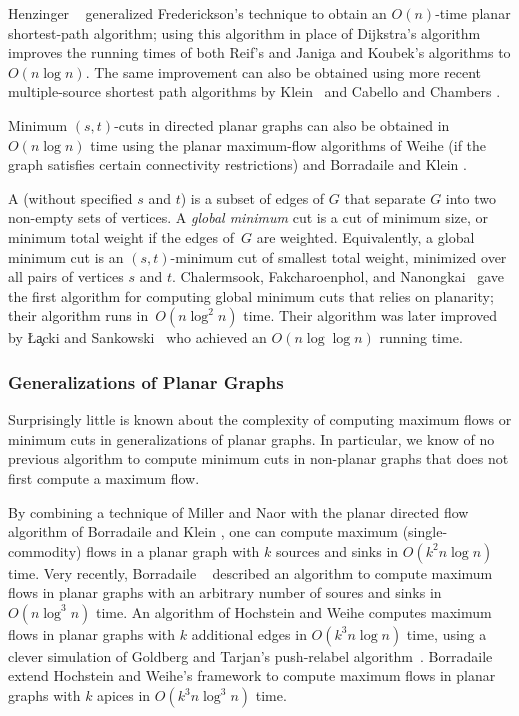 \documentclass[11pt,twoside]{article}
\begin{document}
Henzinger \etal~\cite{hkrs-fspap-97} generalized Frederickson's technique to obtain an $O(n)$-time planar shortest-path algorithm; using this algorithm in place of Dijkstra's algorithm improves the running times of both Reif's and Janiga and Koubek's algorithms to $O(n\log n)$.  The same improvement can also be obtained using more recent multiple-source shortest path algorithms by Klein~\cite{k-msspp-05} and Cabello and Chambers \cite{cc-msspg-07}.

Minimum $(s,t)$-cuts in directed planar graphs can also be obtained in $O(n\log n)$ time using the planar maximum-flow algorithms of Weihe \cite{w-mstfp-97} (if the graph satisfies certain connectivity restrictions) and Borradaile and Klein \cite{b-epnfc-08, bk-tamfd-06, bk-amfdp-09}.

A  (without specified $s$ and $t$) is a subset of edges of $G$ that separate $G$ into two non-empty sets of vertices.
A \emph{global minimum} cut is a cut of minimum size, or minimum total weight if the edges of~$G$ are weighted.  Equivalently, a global minimum cut is an $(s,t)$-minimum cut of smallest total weight, minimized over all pairs of vertices $s$ and $t$.  Chalermsook, Fakcharoenphol, and Nanongkai~\cite{cfn-dnlta-04} gave the first algorithm for computing global minimum cuts that relies on planarity; their algorithm runs in~$O(n \log^2 n)$ time. Their algorithm was later improved by \L\c{a}cki and Sankowski~\cite{ls-mcsc-11} who achieved an $O(n \log \log n)$ running time.

\subsubsection*{Generalizations of Planar Graphs}

Surprisingly little is known about the complexity of computing maximum flows or minimum cuts in generalizations of planar graphs.  In particular, we know of no previous algorithm to compute minimum cuts in non-planar graphs that does not first compute a maximum flow.

By combining a technique of Miller and Naor \cite{mn-fpgms-95} with the planar directed flow algorithm of Borradaile and Klein \cite{b-epnfc-08, bk-tamfd-06, bk-amfdp-09, e-mfpsp-10}, one can compute maximum (single-commodity) flows in a planar graph with $k$ sources and sinks in $O(k^2 n\log n)$ time.  Very recently, Borradaile \etal~\cite{bkmnw-msmsm-17} described an algorithm to compute maximum flows in planar graphs with an arbitrary number of soures and sinks in $O(n\log^3 n)$ time.  An algorithm of Hochstein and Weihe \cite{hw-mstfkc-07} computes maximum flows in planar graphs with $k$ additional edges in $O(k^3n\log n)$ time, using a clever simulation of Goldberg and Tarjan's push-relabel algorithm~\cite{gt-namfp-88}.  Borradaile \etal~\cite{bkmnw-msmsm-17} extend Hochstein and Weihe’s framework to compute maximum flows in planar graphs with $k$ apices in $O(k^3n\log^3 n)$ time.
\end{document}
